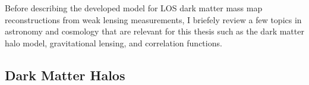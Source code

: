 \documentclass[%
 reprint,
 amsmath,amssymb,
 aps,nofootinbib
]{revtex4-1}
\begin{document}
Before describing the developed model for LOS dark matter mass map reconstructions from weak lensing measurements, I briefely review a few topics in astronomy and cosmology that are relevant for this thesis such as the dark matter halo model, gravitational lensing, and correlation functions.

\subsection{Dark Matter Halos} \label{halos}

\end{document}
